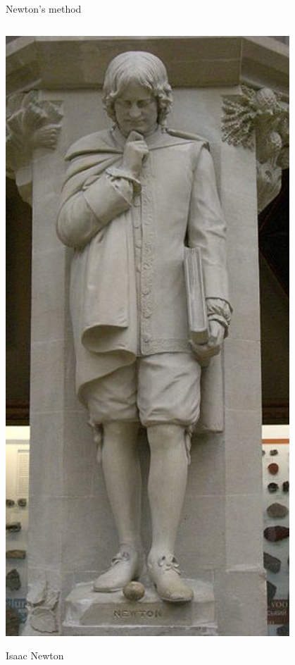 \documentclass[10pt,
               hyperref={colorlinks,citecolor=DeepPink4,linkcolor=black,urlcolor=blue},
               svgnames]{beamer}
\begin{document}
\begin{frame}{Newton's method}
\begin{columns}
\begin{column}{0.2\textwidth}
\hfill \includegraphics[width=0.8\textwidth]{figs/people/inewton.jpg}

\hfill {\tiny Isaac Newton}
\end{column}
\end{columns}
\end{frame}
\end{document}
